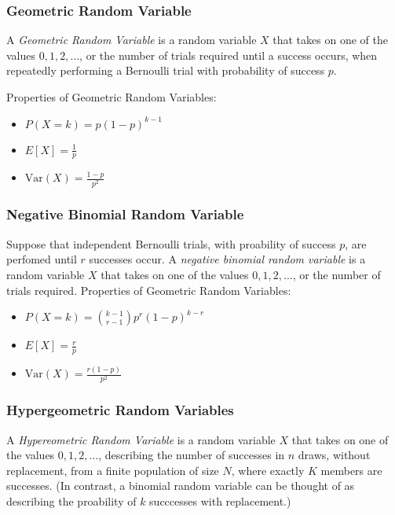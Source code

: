 \documentclass[10pt]{article}
\begin{document}
		\subsubsection*{Geometric Random Variable}
		A \emph{Geometric Random Variable} is a random variable $X$ that takes on one of the values $0, 1, 2, \ldots$, or the number of trials required until a success occurs, when repeatedly performing a Bernoulli trial with probability of success $p$.
		
		\noindent Properties of Geometric Random Variables:
		
		\begin{multicols}{3}
			\begin{itemize}
				\item $P(X=k) = p(1-p)^{k-1}$
				\item $E[X] = \frac{1}{p}$
				\item $\text{Var}(X)= \frac{1-p}{p^2} $
			\end{itemize}
		\end{multicols}
		
		\subsubsection*{Negative Binomial Random Variable}
		
		Suppose that independent Bernoulli trials, with proability of success $p$, are perfomed until $r$ successes occur. A \emph{negative binomial random variable} is a random variable $X$ that takes on one of the values $0, 1, 2, \ldots$, or the number of trials required.
		\noindent Properties of Geometric Random Variables:
		
		\begin{multicols}{3}
			\begin{itemize}
				\item $P(X=k) = {{k-1} \choose {r-1}}p^r(1-p)^{k-r}$
				\item $E[X] = \frac{r}{p}$
				\item $\text{Var}(X)= \frac{r(1-p)}{p^2} $
			\end{itemize}
		\end{multicols}
		
		\subsubsection*{Hypergeometric Random Variables}
		A \emph{Hypereometric Random Variable} is a random variable $X$ that takes on one of the values $0, 1, 2, \ldots$, describing the number of successes in $n$ draws, without replacement, from a finite population of size $N$, where exactly $K$ members are successes. (In contrast, a binomial random variable can be thought of as describing the proability of $k$ succcesses with replacement.)
\end{document}
